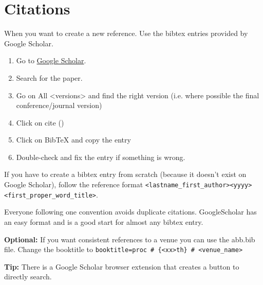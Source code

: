 \section{Citations}\label{sec:citations}

When you want to create a new reference. Use the bibtex entries provided by Google Scholar.

\begin{enumerate}
	\item Go to \href{https://scholar.google.com/}{Google Scholar}.
\item Search for the paper.
\item Go on All <versions> and find the right version (i.e. where possible the final conference/journal version)
\item Click on cite ()
\item Click on BibTeX and copy the entry
\item Double-check and fix the entry if something is wrong.
\end{enumerate}

If you have to create a bibtex entry from scratch (because it doesn't exist on Google Scholar), follow the reference format \verb|<lastname_first_author><yyyy><first_proper_word_title>|.

\begin{whyblock}
 Everyone following one convention avoids duplicate citations. GoogleScholar has an easy format and is a good start for almost any bibtex entry.
\end{whyblock}

\textbf{Optional:} If you want consistent references to a venue you can use the abb.bib file. Change the booktitle to \verb|booktitle=proc # {<xx>th} # <venue_name>|

\textbf{Tip:} There is a Google Scholar browser extension that creates a button to directly search.